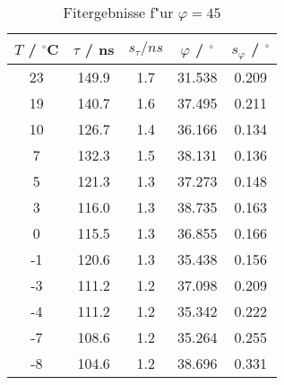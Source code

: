 \begin{table}[H]
\caption{Fitergebnisse f"ur $\varphi=45$}
\begin{center}
\begin{tabular}{|c|c|c|c|c|}
  \hline
  $T$ / ${}^{\circ}$C & $\tau$ / ns & $s_{\tau} / ns$ & $\varphi$ / ${}^{\circ}$ & $s_{\varphi}$ / ${}^{\circ}$ \\ \hline
  23 & 149.9 & 1.7 & 31.538 & 0.209 \\ \hline
  19 & 140.7 & 1.6 & 37.495 & 0.211 \\ \hline
  10 & 126.7 & 1.4 & 36.166 & 0.134 \\ \hline
  7 & 132.3 & 1.5 & 38.131 & 0.136 \\ \hline
  5 & 121.3 & 1.3 & 37.273 & 0.148 \\ \hline
  3 & 116.0 & 1.3 & 38.735 & 0.163 \\ \hline
  0 & 115.5 & 1.3 & 36.855 & 0.166 \\ \hline
  -1 & 120.6 & 1.3 & 35.438 & 0.156 \\ \hline
  -3 & 111.2 & 1.2 & 37.098 & 0.209 \\ \hline
  -4 & 111.2 & 1.2 & 35.342 & 0.222 \\ \hline
  -7 & 108.6 & 1.2 & 35.264 & 0.255 \\ \hline
  -8 & 104.6 & 1.2 & 38.696 & 0.331 \\ \hline
\end{tabular}
\end{center}
\label{tab:phi:45}
\end{table}
